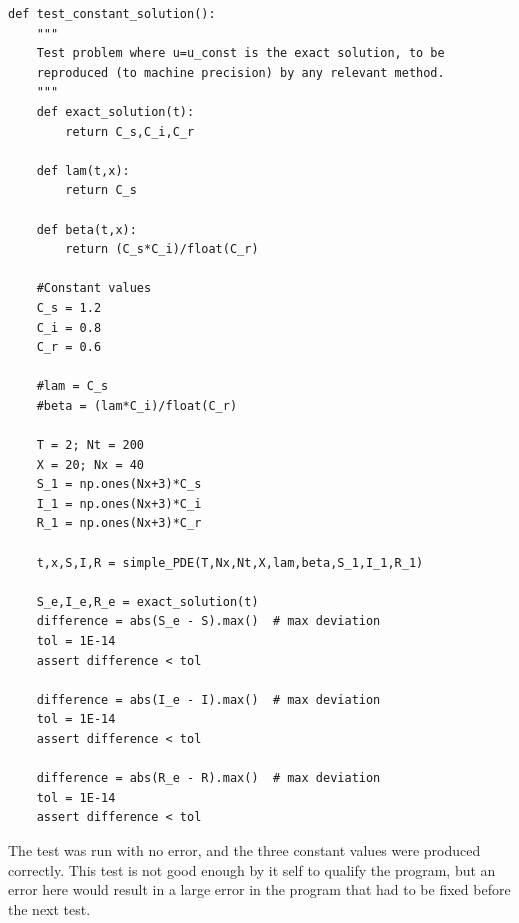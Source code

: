 \documentclass[%
twoside,                 %
final,                   %
10pt]{article}
\begin{document}
\begin{Verbatim}[numbers=none,fontsize=\fontsize{9pt}{9pt},baselinestretch=0.95]
def test_constant_solution():
    """
    Test problem where u=u_const is the exact solution, to be
    reproduced (to machine precision) by any relevant method.
    """
    def exact_solution(t):
        return C_s,C_i,C_r
    
    def lam(t,x):
        return C_s

    def beta(t,x):
        return (C_s*C_i)/float(C_r)

    #Constant values
    C_s = 1.2
    C_i = 0.8
    C_r = 0.6
    
    #lam = C_s
    #beta = (lam*C_i)/float(C_r)
    
    T = 2; Nt = 200
    X = 20; Nx = 40
    S_1 = np.ones(Nx+3)*C_s
    I_1 = np.ones(Nx+3)*C_i
    R_1 = np.ones(Nx+3)*C_r
    
    t,x,S,I,R = simple_PDE(T,Nx,Nt,X,lam,beta,S_1,I_1,R_1)
    
    S_e,I_e,R_e = exact_solution(t)
    difference = abs(S_e - S).max()  # max deviation
    tol = 1E-14
    assert difference < tol

    difference = abs(I_e - I).max()  # max deviation
    tol = 1E-14
    assert difference < tol

    difference = abs(R_e - R).max()  # max deviation
    tol = 1E-14
    assert difference < tol
\end{Verbatim}

The test was run with no error, and the three constant values were produced correctly. This test is not good enough by it self to qualify the program, but an error here would result in a large error in the program that had to be fixed before the next test. 
\end{document}
